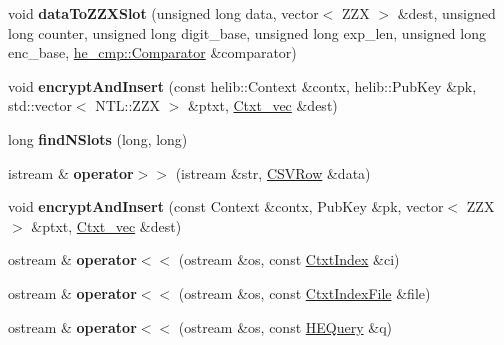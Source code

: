\begin{DoxyCompactItemize}
void {\bfseries data\+To\+Z\+Z\+X\+Slot} (unsigned long data, vector$<$ Z\+ZX $>$ \&dest, unsigned long counter, unsigned long digit\+\_\+base, unsigned long exp\+\_\+len, unsigned long enc\+\_\+base, \hyperlink{classhe__cmp_1_1Comparator}{he\+\_\+cmp\+::\+Comparator} \&comparator)
\item 
\mbox{\label{namespaceHDB__supergate___a6eb55ba8f055d3208533a3bd27ce0dc1}} 
void {\bfseries encrypt\+And\+Insert} (const helib\+::\+Context \&contx, helib\+::\+Pub\+Key \&pk, std\+::vector$<$ N\+T\+L\+::\+Z\+ZX $>$ \&ptxt, \hyperlink{namespaceHDB__supergate___ade0781b5973aae08b689ed72b30511fb}{Ctxt\+\_\+vec} \&dest)
\item 
\mbox{\label{namespaceHDB__supergate___a6749e17e945751fdc476b5261fd5cfc4}} 
long {\bfseries find\+N\+Slots} (long, long)
\item 
\mbox{\label{namespaceHDB__supergate___ac56b9dc7cd1fdf4bd57aae660839d1b8}} 
istream \& {\bfseries operator$>$$>$} (istream \&str, \hyperlink{classHDB__supergate___1_1CSVRow}{C\+S\+V\+Row} \&data)
\item 
\mbox{\label{namespaceHDB__supergate___a287bd0316c75a81e2b7c8efb5b7d662b}} 
void {\bfseries encrypt\+And\+Insert} (const Context \&contx, Pub\+Key \&pk, vector$<$ Z\+ZX $>$ \&ptxt, \hyperlink{namespaceHDB__supergate___ade0781b5973aae08b689ed72b30511fb}{Ctxt\+\_\+vec} \&dest)
\item 
\mbox{\label{namespaceHDB__supergate___a9b8b804a1eb356975c2f32bbb5291765}} 
ostream \& {\bfseries operator$<$$<$} (ostream \&os, const \hyperlink{classHDB__supergate___1_1CtxtIndex}{Ctxt\+Index} \&ci)
\item 
\mbox{\label{namespaceHDB__supergate___a1f620bd252adb314c9872a073d05ea08}} 
ostream \& {\bfseries operator$<$$<$} (ostream \&os, const \hyperlink{classHDB__supergate___1_1CtxtIndexFile}{Ctxt\+Index\+File} \&file)
\item 
\mbox{\label{namespaceHDB__supergate___a2c8edacbe85eb58fd25383ff7a1e099e}} 
ostream \& {\bfseries operator$<$$<$} (ostream \&os, const \hyperlink{classHDB__supergate___1_1HEQuery}{H\+E\+Query} \&q)
\end{DoxyCompactItemize}


